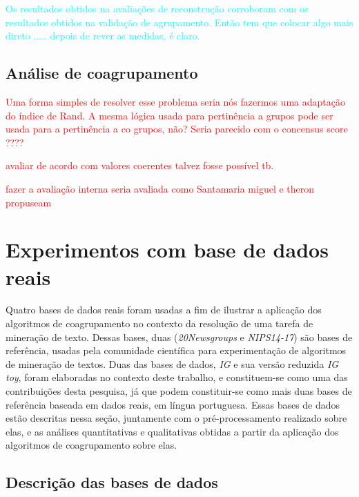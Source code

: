 \documentclass[
    12pt,                %
    oneside,            %
    a4paper,            %
    english,            %
    brazil                %
    ]{abntex2ppgsi}
\begin{document}
\textcolor{cyan}{Os resultados obtidos na avaliações de reconstrução corroboram com os resultados obtidos na validação de agrupamento. Então tem que colocar algo mais direto ..... depois de rever as medidas, é claro.}

\subsection{Análise de coagrupamento}

\textcolor{red}{Uma forma simples de resolver esse problema seria nós fazermos uma adaptação do índice de Rand. A mesma lógica usada para pertinência a grupos pode ser usada para a pertinência a co grupos, não? Seria parecido com o concensus score ???? }

\textcolor{red}{avaliar de acordo com valores coerentes talvez fosse possível tb.}

\textcolor{red}{fazer a avaliação interna seria avaliada como Santamaria miguel e theron propuseam}

\section{Experimentos com base de dados reais}

Quatro bases de dados reais foram usadas a fim de ilustrar a aplicação dos algoritmos de coagrupamento no contexto da resolução de uma tarefa de mineração de texto. Dessas bases, duas (\textit{20Newsgroups} e \textit{NIPS14-17}) são bases de referência, usadas pela comunidade científica para experimentação de algoritmos de mineração de textos. Duas das bases de dados, \textit{IG} e sua versão reduzida \textit{IG toy}, foram elaboradas no contexto deste trabalho, e constituem-se como uma das contribuições desta pesquisa, já que podem constituir-se como mais duas bases de referência baseada em dados reais, em língua portuguesa. Essas bases de dados estão descritas nessa seção, juntamente com o pré-processamento realizado sobre elas, e as análises quantitativas e qualitativas obtidas a partir da aplicação dos algoritmos de coagrupamento sobre elas.

\subsection{Descrição das bases de dados}
\end{document}
